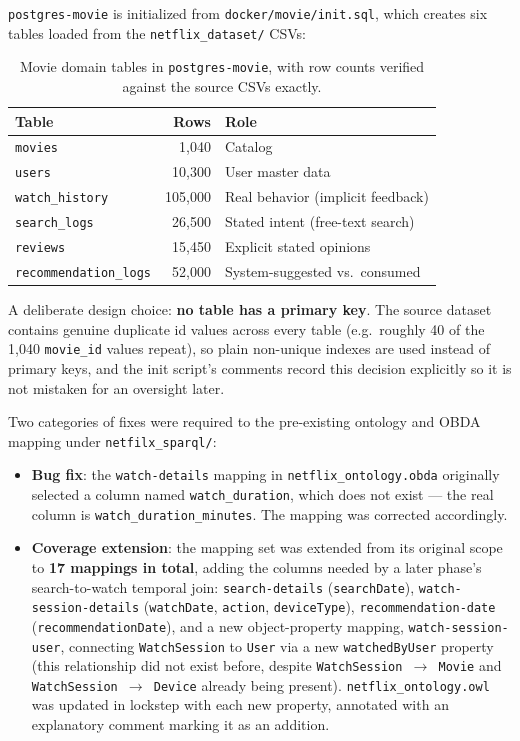 \documentclass[11pt,a4paper]{article}
\newcommand{\code}[1]{\texttt{#1}}
\begin{document}
\code{postgres-movie} is initialized from \code{docker/movie/init.sql}, which creates six tables
loaded from the \code{netflix\_dataset/} CSVs:

\begin{table}[H]
\centering
\begin{tabular}{lrl}
\toprule
\textbf{Table} & \textbf{Rows} & \textbf{Role} \\
\midrule
\code{movies}              & 1{,}040   & Catalog \\
\code{users}               & 10{,}300  & User master data \\
\code{watch\_history}       & 105{,}000 & Real behavior (implicit feedback) \\
\code{search\_logs}         & 26{,}500  & Stated intent (free-text search) \\
\code{reviews}             & 15{,}450  & Explicit stated opinions \\
\code{recommendation\_logs} & 52{,}000  & System-suggested vs.\ consumed \\
\bottomrule
\end{tabular}
\caption{Movie domain tables in \code{postgres-movie}, with row counts verified against the
source CSVs exactly.}
\label{tab:movie-tables}
\end{table}

\noindent A deliberate design choice: \textbf{no table has a primary key}. The source dataset
contains genuine duplicate id values across every table (e.g.\ roughly 40 of the 1{,}040
\code{movie\_id} values repeat), so plain non-unique indexes are used instead of primary keys,
and the init script's comments record this decision explicitly so it is not mistaken for an
oversight later.

Two categories of fixes were required to the pre-existing ontology and OBDA mapping under
\code{netfilx\_sparql/}:

\begin{itemize}
    \item \textbf{Bug fix}: the \code{watch-details} mapping in \code{netflix\_ontology.obda}
        originally selected a column named \code{watch\_duration}, which does not exist --- the
        real column is \code{watch\_duration\_minutes}. The mapping was corrected accordingly.
    \item \textbf{Coverage extension}: the mapping set was extended from its original scope to
        \textbf{17 mappings in total}, adding the columns needed by a later phase's
        search-to-watch temporal join: \code{search-details} (\code{searchDate}),
        \code{watch-session-details} (\code{watchDate}, \code{action}, \code{deviceType}),
        \code{recommendation-date} (\code{recommendationDate}), and a new object-property
        mapping, \code{watch-session-user}, connecting \code{WatchSession} to \code{User} via a
        new \code{watchedByUser} property (this relationship did not exist before, despite
        \code{WatchSession $\to$ Movie} and \code{WatchSession $\to$ Device} already being
        present). \code{netflix\_ontology.owl} was updated in lockstep with each new property,
        annotated with an explanatory comment marking it as an addition.
\end{itemize}
\end{document}
